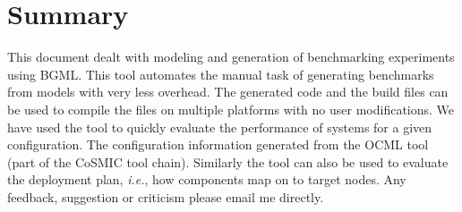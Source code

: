 \documentclass[onecolumn]{article}
\begin{document}
\section* {Summary}
This document dealt with modeling and generation of benchmarking
experiments using BGML. This tool automates the manual task of
generating benchmarks from models with very less overhead. The
generated code and the build files can be used to compile the files on
multiple platforms with no user modifications. We have used the tool
to quickly evaluate the performance of systems for a given configuration.
The configuration information generated from the OCML tool (part of the
CoSMIC tool chain). Similarly the tool can also be used to evaluate the
deployment plan, {\em i.e.}, how components map on to target nodes. Any
feedback, suggestion or criticism please email me directly.
\end{document}
